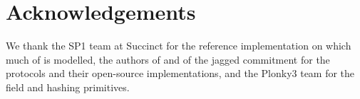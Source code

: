 \section*{Acknowledgements}

We thank the SP1 team at Succinct for the reference implementation on which much of \Ziren{} is modelled, the authors of \WHIR{} and of the jagged commitment for the protocols and their open-source implementations, and the Plonky3 team for the field and hashing primitives.
